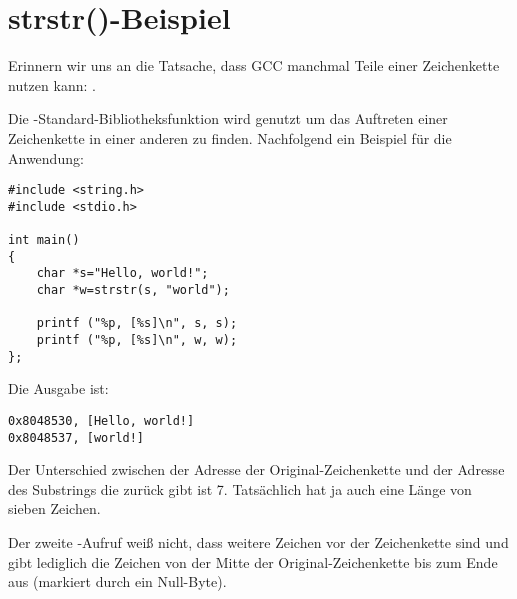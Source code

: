 \section{strstr()-Beispiel}
\label{strstr_example}

Erinnern wir uns an die Tatsache, dass GCC manchmal Teile einer Zeichenkette nutzen kann: .

Die  \CCpp-Standard-Bibliotheksfunktion wird genutzt um das Auftreten einer Zeichenkette
in einer anderen zu finden.
Nachfolgend ein Beispiel für die Anwendung:

\begin{lstlisting}[style=customc]
#include <string.h>
#include <stdio.h>

int main()
{
	char *s="Hello, world!";
	char *w=strstr(s, "world");

	printf ("%p, [%s]\n", s, s);
	printf ("%p, [%s]\n", w, w);
};
\end{lstlisting}

Die Ausgabe ist:

\begin{lstlisting}
0x8048530, [Hello, world!]
0x8048537, [world!]
\end{lstlisting}

Der Unterschied zwischen der Adresse der Original-Zeichenkette und der Adresse des Substrings die
 zurück gibt ist 7.
Tatsächlich hat  ja auch eine Länge von sieben Zeichen.

Der zweite \printf-Aufruf weiß nicht, dass weitere Zeichen vor der Zeichenkette sind und gibt lediglich die
Zeichen von der Mitte der Original-Zeichenkette bis zum Ende aus (markiert durch ein Null-Byte).
